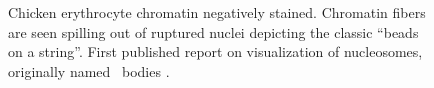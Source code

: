   \begin{figure}
    \centering
                 {Chicken erythrocyte chromatin negatively stained.
                  Chromatin fibers are seen spilling out of ruptured
                  nuclei depicting the classic ``beads on a string''.
                  First published report on
                  visualization of nucleosomes, originally named
                  \textnu~bodies \citep{olins1974-nu-bodies}.}
    \label{fig:intro:beads-on-a-string}
  \end{figure}

